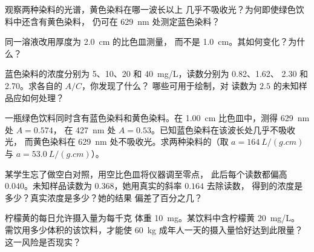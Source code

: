 \begin{exercise}[$\star\star$]\label{exo:g11:absorbance:10}
观察两种染料的光谱，黄色染料在哪一波长以上
几乎不吸收光？为何即使绿色饮料中还含有黄色染料，
仍可在 \qty{629}{nm} 处测定蓝色染料？
\end{exercise}

\begin{exercise}[$\star\star$]\label{exo:g11:absorbance:11}
同一溶液改用厚度为 \qty{2.0}{cm} 的比色皿测量，
而不是 \qty{1.0}{cm}。其如何变化？为什么？
\end{exercise}

\begin{exercise}[$\star\star\star$]\label{exo:g11:absorbance:12}
蓝色染料的浓度分别为 5、10、20 和 \qty{40}{mg/L}，读数分别为 0.82、1.62、
2.30 和 2.70。求各自的 $A / C$，你发现了什么？
哪些可用于绘制，对
读数为 $2.5$ 的未知样品应如何处理？
\end{exercise}

\begin{exercise}[$\star\star\star$]\label{exo:g11:absorbance:13}
一瓶绿色饮料同时含有蓝色染料和黄色染料。在
\qty{1.00}{cm} 比色皿中，测得 \qty{629}{nm} 处 $A = 0.574$，
在 \qty{427}{nm} 处 $A = 0.53$。已知蓝色染料在该波长处几乎不吸收光，
而黄色染料在 \qty{629}{nm} 处不吸收光。求两种染料的（取 $a = \qty{164}{L/(g.cm)}$ 与
$a = \qty{53.0}{L/(g.cm)}$）。
\end{exercise}

\begin{exercise}[$\star\star\star$]\label{exo:g11:absorbance:14}
某学生忘了做空白对照，用空比色皿将仪器调至零点，
此后每个读数都偏高 \num{0.040}。未知样品读数为
$0.368$，她用真实的斜率 $0.164$ 去除读数，
得到的浓度是多少？真实浓度是多少？她的结果
偏差了百分之几？
\end{exercise}

\begin{exercise}[$\star\star\star$]\label{exo:g11:absorbance:15}
柠檬黄的每日允许摄入量为每千克
体重 \qty{10}{mg}。某饮料中含柠檬黄 \qty{20}{mg/L}。
需饮用多少体积的该饮料，才能使 \qty{60}{kg} 成年人一天的摄入量恰好达到此限量？
这一风险是否现实？
\end{exercise}

